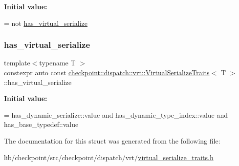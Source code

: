 {\bfseries Initial value\+:}
\begin{DoxyCode}
=
    not \hyperlink{structcheckpoint_1_1dispatch_1_1vrt_1_1_virtual_serialize_traits_a21d83fdae98269101791620d64160887}{has\_virtual\_serialize}
\end{DoxyCode}
\mbox{\label{structcheckpoint_1_1dispatch_1_1vrt_1_1_virtual_serialize_traits_a21d83fdae98269101791620d64160887}} 
\subsubsection{\texorpdfstring{has\+\_\+virtual\+\_\+serialize}{has\_virtual\_serialize}}
{\footnotesize\ttfamily template$<$typename T $>$ \\
constexpr auto const \hyperlink{structcheckpoint_1_1dispatch_1_1vrt_1_1_virtual_serialize_traits}{checkpoint\+::dispatch\+::vrt\+::\+Virtual\+Serialize\+Traits}$<$ T $>$\+::has\+\_\+virtual\+\_\+serialize\hspace{0.3cm}{\ttfamily [static]}}

{\bfseries Initial value\+:}
\begin{DoxyCode}
=
    has\_dynamic\_serialize::value and
    has\_dynamic\_type\_index::value and
    has\_base\_typedef::value
\end{DoxyCode}


The documentation for this struct was generated from the following file\+:\begin{DoxyCompactItemize}
\item 
lib/checkpoint/src/checkpoint/dispatch/vrt/\hyperlink{virtual__serialize__traits_8h}{virtual\+\_\+serialize\+\_\+traits.\+h}\end{DoxyCompactItemize}
